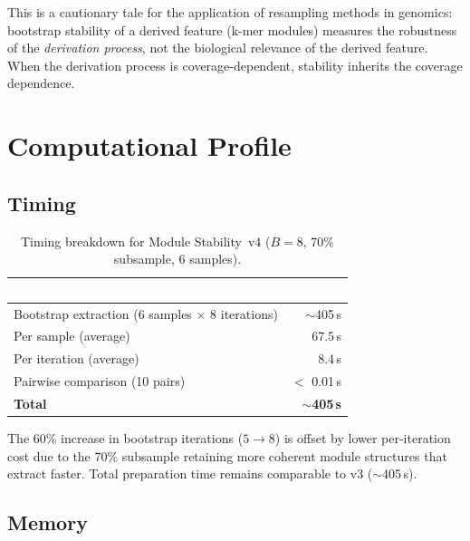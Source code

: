 \documentclass{../yalumba}
\begin{document}
This is a cautionary tale for the application of resampling methods in
genomics: bootstrap stability of a derived feature (k-mer modules) measures
the robustness of the \emph{derivation process}, not the biological relevance
of the derived feature.  When the derivation process is coverage-dependent,
stability inherits the coverage dependence.


\section{Computational Profile}
\label{sec:computational}

\subsection{Timing}

\begin{table}[H]
  \centering
  \tablestyle
  \caption{Timing breakdown for Module Stability~v4 ($B = 8$, 70\% subsample,
    6 samples).}
  \label{tab:timing}
  \begin{tabular}{lr}
    \toprule
    \rowcolor{table-header}
    \textcolor{white}{\textbf{Phase}} &
    \textcolor{white}{\textbf{Time}} \\
    \midrule
    Bootstrap extraction (6 samples $\times$ 8 iterations) & $\sim$405\,s \\
    \quad Per sample (average) & 67.5\,s \\
    \quad Per iteration (average) & 8.4\,s \\
    Pairwise comparison (10 pairs) & $<$ 0.01\,s \\
    \midrule
    \textbf{Total} & $\sim$\textbf{405\,s} \\
    \bottomrule
  \end{tabular}
\end{table}


The 60\% increase in bootstrap iterations ($5 \to 8$) is offset by lower
per-iteration cost due to the 70\% subsample retaining more coherent module
structures that extract faster.  Total preparation time remains comparable
to v3 ($\sim$405\,s).

\subsection{Memory}
\end{document}
